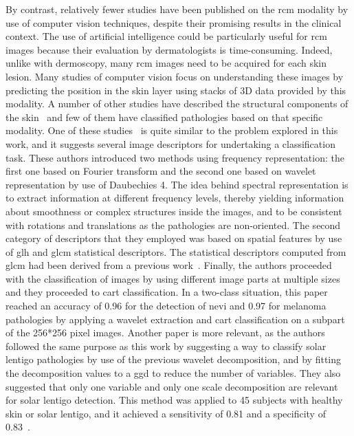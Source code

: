 \documentclass[journal,article,submit,moreauthors,pdftex, applsci]{Definitions/mdpi}
\begin{document}
By contrast, relatively fewer studies have been published on the \ac{rcm} modality by use of computer vision techniques, despite their promising results in the clinical context. The use of artificial intelligence could be particularly useful for \ac{rcm} images because their evaluation by dermatologists is time-consuming. Indeed, unlike with dermoscopy, many \ac{rcm} images need to be acquired for each skin lesion. Many studies of computer vision focus on understanding these images by predicting the position in the skin layer \cite{Somoza2014,Hames2016} using stacks of 3D data provided by this modality. A number of other studies have described the structural components of the skin~\cite{Gareau2010} and few of them have classified pathologies based on that specific modality. One of these studies~\cite{Wiltgen2008} is quite similar to the problem explored in this work, and it suggests several image descriptors for undertaking a classification task. These authors introduced two methods using frequency representation: the first one based on Fourier transform and the second one based on wavelet representation by use of Daubechies 4. The idea behind spectral representation is to extract information at different frequency levels, thereby yielding information about smoothness or complex structures inside the images, and to be consistent with rotations and translations as the pathologies are non-oriented. The second category of descriptors that they employed was based on spatial features by use of \ac{glh} and \ac{glcm} statistical descriptors. The statistical descriptors computed from \ac{glcm} had been derived from a previous work~\cite{Haralick1973}. Finally, the authors proceeded with the classification of images by using different image parts at multiple sizes and they proceeded to \ac{cart} classification. In a two-class situation, this paper reached an accuracy of 0.96 for the detection of nevi and 0.97 for melanoma pathologies by applying a wavelet extraction and \ac{cart} classification on a subpart of the 256*256 pixel images. Another paper is more relevant, as the authors followed the same purpose as this work by suggesting a way to classify solar lentigo pathologies by use of the previous wavelet decomposition, and by fitting the decomposition values to a \ac{ggd} to reduce the number of variables. They also suggested that only one variable and only one scale decomposition are relevant for solar lentigo detection. This method was applied to 45 subjects with healthy skin or solar lentigo, and it achieved a sensitivity of 0.81 and a specificity of 0.83~\cite{Halimi2017a}.\par
\end{document}
